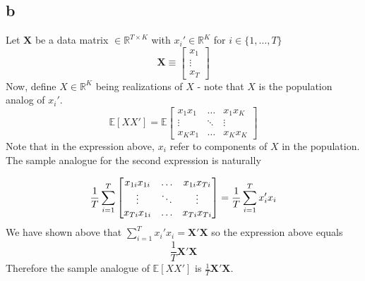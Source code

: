 \documentclass[12pt,notitlepage]{article}
\newcommand{\E}{\mathbb{E}}
\newcommand{\R}{\mathbb{R}}
\begin{document}
\subsection*{b}
Let $\bm{X}$ be a data matrix $\in \R^{T \times K}$ with $x_i' \in \R^K$ for $i \in \{1, \dots, T\}$
\begin{equation*}
    \bm{X} \equiv 
    \begin{bmatrix}
    x_1 \\ \vdots \\ x_T
    \end{bmatrix}
\end{equation*}
Now, define $X \in \R^K$  being realizations of $X$ - note that $X$ is the population analog of $x_i'$.
\begin{equation*}
    \E[XX'] = \E \begin{bmatrix}
    x_{1}x_{1} & \hdots &  x_{1}x_{K} \\
    \vdots & \ddots & \vdots \\
     x_{K}x_{1} & \hdots & x_{K}x_{K}
    \end{bmatrix} 
\end{equation*} 
Note that in the expression above, $x_i$ refer to components of $X$ in the population. 
The sample analogue for the second expression is naturally 

\begin{equation*}
\frac{1}{T}\sum_{i=1}^T \begin{bmatrix}
     x_{1i}x_{1i} & \hdots &  x_{1i}x_{Ti} \\
    \vdots & \ddots & \vdots \\
     x_{Ti}x_{1i} & \hdots & x_{Ti}x_{Ti}
    \end{bmatrix}  = \frac1T \sum_{i=1}^T x_i'x_i\\
\end{equation*}
We have shown above that $\sum_{i=1}^T x_i'x_i = \bm{X'X}$ so the expression above equals
\begin{equation*}
    \frac{1}{T}\bm{X'X}
\end{equation*}
Therefore the sample analogue of $\E[XX']$ is $\frac{1}{T}\bm{X'X}$.
\end{document}
